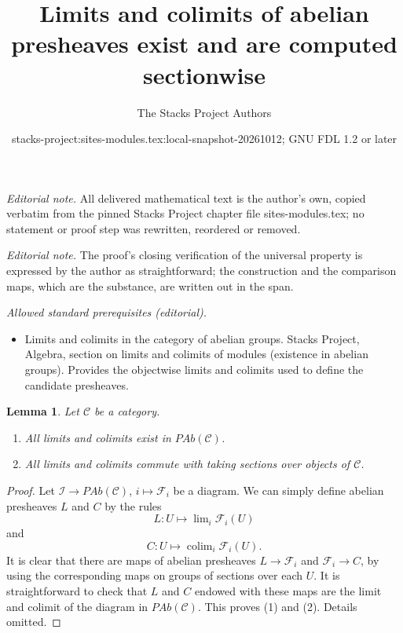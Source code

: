 \documentclass[10pt,a4paper]{amsart}
\title{Limits and colimits of abelian presheaves exist and are computed sectionwise}
\author{The Stacks Project Authors}
\date{stacks-project:sites-modules.tex:local-snapshot-20261012; GNU FDL 1.2 or later}
\theoremstyle{plain}
\newtheorem{lemma}[subsection]{Lemma}
\theoremstyle{definition}
\theoremstyle{remark}
\numberwithin{equation}{subsection}
\def\lim{\mathop{\mathrm{lim}}\nolimits}
\def\colim{\mathop{\mathrm{colim}}\nolimits}
\begin{document}
\maketitle
\noindent\textit{Editorial note.} All delivered mathematical text is the author's own, copied verbatim from the pinned Stacks Project chapter file sites-modules.tex; no statement or proof step was rewritten, reordered or removed.\par\medskip
\noindent\textit{Editorial note.} The proof's closing verification of the universal property is expressed by the author as straightforward; the construction and the comparison maps, which are the substance, are written out in the span.\par\medskip
\noindent\textit{Allowed standard prerequisites (editorial).}\begin{itemize}
\item Limits and colimits in the category of abelian groups. Stacks Project, Algebra, section on limits and colimits of modules (existence in abelian groups). Provides the objectwise limits and colimits used to define the candidate presheaves.
\end{itemize}\medskip
\begin{lemma}
\label{lemma-limits-colimits-abelian-presheaves}
Let $\mathcal{C}$ be a category.
\begin{enumerate}
\item All limits and colimits exist in $\textit{PAb}(\mathcal{C})$.
\item All limits and colimits commute with taking sections over objects of
$\mathcal{C}$.
\end{enumerate}
\end{lemma}

\begin{proof}
Let $\mathcal{I} \to \textit{PAb}(\mathcal{C})$, $i \mapsto \mathcal{F}_i$
be a diagram. We can simply define abelian presheaves
$L$ and $C$ by the rules
$$
L : U \longmapsto \lim_i \mathcal{F}_i(U)
$$
and
$$
C : U \longmapsto \colim_i \mathcal{F}_i(U).
$$
It is clear that there are maps of abelian presheaves $L \to \mathcal{F}_i$
and $\mathcal{F}_i \to C$, by using the corresponding maps on groups of
sections over each $U$. It is straightforward to check that $L$ and $C$ endowed
with these maps are the limit and colimit of the diagram in
$\textit{PAb}(\mathcal{C})$. This proves (1) and (2). Details omitted.
\end{proof}
\end{document}
